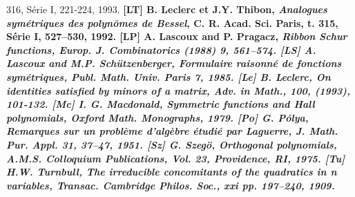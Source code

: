 316, S\'erie I, 221-224, 1993.
\medskip
\bf[LT]\rm\hskip 5mm {\petcap B. Leclerc et J.Y. Thibon}, {\it  Analogues 
sym\'etriques des polyn\^omes de Bessel}, C. R. Acad. Sci. Paris, t. 315, S\'erie 
I, 527--530, 1992.
\medskip
\bf[LP] \rm\hskip 5mm {\petcap A. Lascoux and P. Pragacz}, \it Ribbon Schur functions, 
\rm Europ. J. Combinatorics (1988) \bf9\rm, 561--574.
\medskip
\bf[LS] \rm\hskip 5mm {\petcap A. Lascoux and M.P. Sch\"utzenberger}, \it Formulaire 
raisonn\'e de fonctions sym\'etriques\rm, Publ. Math. Univ. Paris 7, 1985.
\medskip
\bf[Le] \rm\hskip 5mm {\petcap B. Leclerc}, \it On identities satisfied by minors of a 
matrix\rm, Adv. in Math., 100, (1993), 101-132.
\medskip
\bf[Mc] \rm\hskip 5mm {\petcap I. G. Macdonald}, \it Symmetric functions and Hall 
polynomials\rm, Oxford Math. Monographs, 1979.
\medskip
\bf[Po]\rm\hskip 5mm {\petcap G. P\'olya}, {\it  Remarques sur un probl\`eme 
d'alg\`ebre \'etudi\'e par Laguerre}, J. Math. Pur. Appl. 31, 37--47, 1951.
\medskip
\bf[Sz]\rm\hskip 5mm {\petcap G. Szeg\"o}, {\it  Orthogonal polynomials}, 
A.M.S. Colloquium Publications, Vol. 23, Providence, RI, 1975.
\medskip
\bf[Tu]\rm\hskip 5mm {\petcap H.W. Turnbull}, {\it  The irreducible concomitants 
of the quadratics in n variables}, Transac. Cambridge Philos. Soc., xxi pp. 
197--240, 1909.
\medskip
\bye

